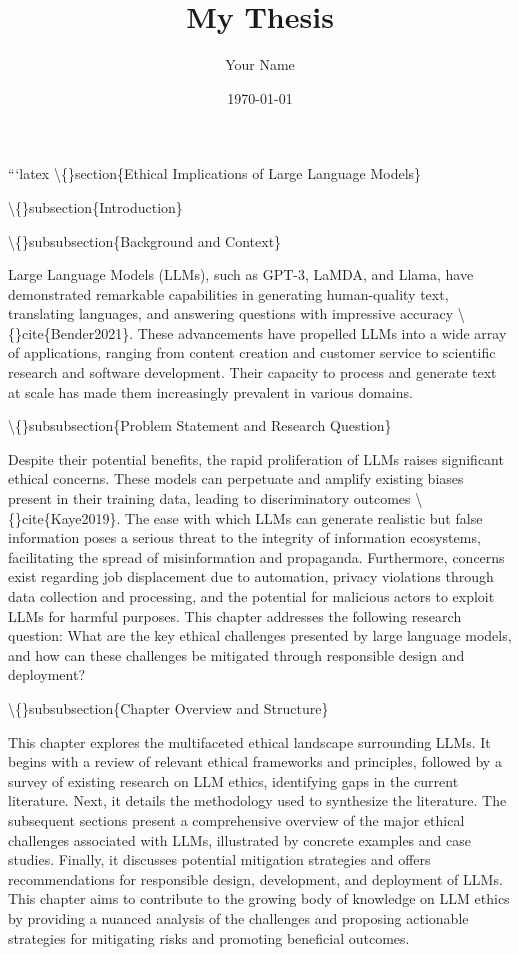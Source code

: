 \documentclass{article}
\title{My Thesis}
\author{Your Name}
\date{\today}
\begin{document}
\maketitle

```latex
\textbackslash\{\}section\{Ethical Implications of Large Language Models\}

\textbackslash\{\}subsection\{Introduction\}

\textbackslash\{\}subsubsection\{Background and Context\}

Large Language Models (LLMs), such as GPT-3, LaMDA, and Llama, have demonstrated remarkable capabilities in generating human-quality text, translating languages, and answering questions with impressive accuracy \textbackslash\{\}cite\{Bender2021\}. These advancements have propelled LLMs into a wide array of applications, ranging from content creation and customer service to scientific research and software development. Their capacity to process and generate text at scale has made them increasingly prevalent in various domains.

\textbackslash\{\}subsubsection\{Problem Statement and Research Question\}

Despite their potential benefits, the rapid proliferation of LLMs raises significant ethical concerns. These models can perpetuate and amplify existing biases present in their training data, leading to discriminatory outcomes \textbackslash\{\}cite\{Kaye2019\}. The ease with which LLMs can generate realistic but false information poses a serious threat to the integrity of information ecosystems, facilitating the spread of misinformation and propaganda. Furthermore, concerns exist regarding job displacement due to automation, privacy violations through data collection and processing, and the potential for malicious actors to exploit LLMs for harmful purposes. This chapter addresses the following research question: What are the key ethical challenges presented by large language models, and how can these challenges be mitigated through responsible design and deployment?

\textbackslash\{\}subsubsection\{Chapter Overview and Structure\}

This chapter explores the multifaceted ethical landscape surrounding LLMs. It begins with a review of relevant ethical frameworks and principles, followed by a survey of existing research on LLM ethics, identifying gaps in the current literature. Next, it details the methodology used to synthesize the literature. The subsequent sections present a comprehensive overview of the major ethical challenges associated with LLMs, illustrated by concrete examples and case studies. Finally, it discusses potential mitigation strategies and offers recommendations for responsible design, development, and deployment of LLMs. This chapter aims to contribute to the growing body of knowledge on LLM ethics by providing a nuanced analysis of the challenges and proposing actionable strategies for mitigating risks and promoting beneficial outcomes.
\end{document}

